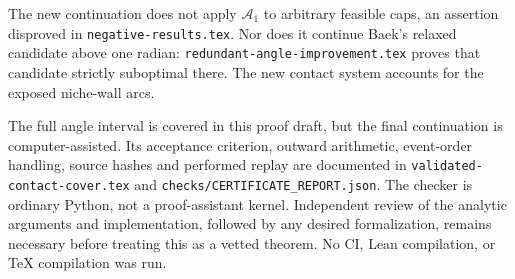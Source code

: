 \documentclass[11pt]{article}
\theoremstyle{remark}\newtheorem{remark}[theorem]{Remark}
\begin{document}
The new continuation does not apply $\mathcal A_1$ to arbitrary feasible caps, an assertion disproved in \texttt{negative-results.tex}. Nor does it continue Baek's relaxed candidate above one radian: \texttt{redundant-angle-improvement.tex} proves that candidate strictly suboptimal there. The new contact system accounts for the exposed niche-wall arcs.

The full angle interval is covered in this proof draft, but the final continuation is computer-assisted. Its acceptance criterion, outward arithmetic, event-order handling, source hashes and performed replay are documented in \texttt{validated-contact-cover.tex} and \texttt{checks/CERTIFICATE\_REPORT.json}. The checker is ordinary Python, not a proof-assistant kernel. Independent review of the analytic arguments and implementation, followed by any desired formalization, remains necessary before treating this as a vetted theorem. No CI, Lean compilation, or TeX compilation was run.
\end{document}
